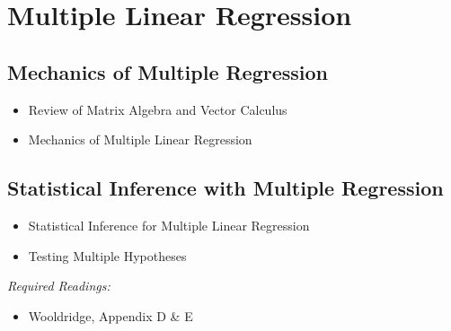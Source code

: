 \documentclass{article}
\begin{document}


\section{Multiple Linear Regression}
\subsection{Mechanics of Multiple Regression}
\begin{itemize}
\item Review of Matrix Algebra and Vector Calculus
\item Mechanics of Multiple Linear Regression
\end{itemize}
\subsection{Statistical Inference with Multiple Regression}
\begin{itemize}
\item Statistical Inference for Multiple Linear Regression
\item Testing Multiple Hypotheses
\end{itemize}
\textit{Required Readings:} \begin{itemize}
  \item Wooldridge, Appendix D \& E
\end{itemize}


\end{document}

